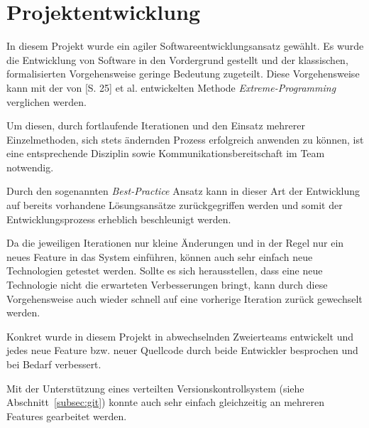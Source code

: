 \section{Projektentwicklung}
\label{sec:development}

In diesem Projekt wurde ein agiler Softwareentwicklungsansatz gewählt. Es wurde
	die Entwicklung von Software in den Vordergrund gestellt und der klassischen,
	formalisierten Vorgehensweise geringe Bedeutung zugeteilt. Diese Vorgehensweise
	kann mit der von \cite{Beck98}[S. 25] et al. entwickelten Methode
	\emph{Extreme-Programming} verglichen werden.
	
Um diesen, durch fortlaufende Iterationen und den Einsatz mehrerer Einzelmethoden,
	sich stets ändernden Prozess erfolgreich anwenden zu können, ist eine entsprechende
	Disziplin sowie Kommunikationsbereitschaft im Team notwendig.
	
Durch den sogenannten \emph{Best-Practice} Ansatz kann in dieser Art der Entwicklung
	auf bereits vorhandene Lösungsansätze zurückgegriffen werden und somit der
	Entwicklungsprozess erheblich beschleunigt werden.
	
Da die jeweiligen Iterationen nur kleine Änderungen und in der Regel nur ein neues
	Feature in das System einführen, können auch sehr einfach neue Technologien
	getestet werden. Sollte es sich herausstellen, dass eine neue Technologie nicht
	die erwarteten Verbesserungen bringt, kann durch diese Vorgehensweise auch wieder
	schnell auf eine vorherige Iteration zurück gewechselt werden.
	
Konkret wurde in diesem Projekt in abwechselnden Zweierteams entwickelt und jedes
	neue Feature bzw. neuer Quellcode durch beide Entwickler besprochen und bei
	Bedarf verbessert.
	
Mit der Unterstützung eines verteilten Versionskontrollsystem (siehe
	Abschnitt~\ref{subsec:git}) konnte auch sehr einfach gleichzeitig an mehreren
	Features gearbeitet werden.
